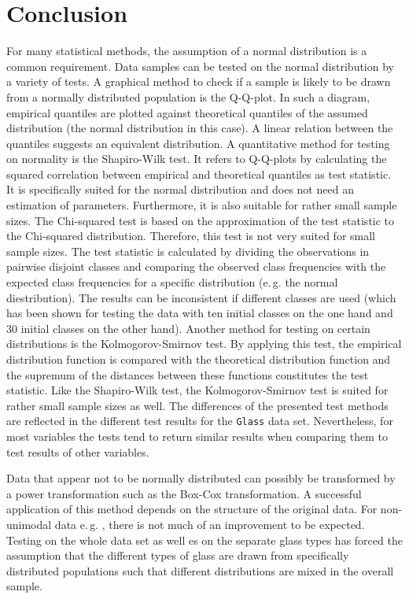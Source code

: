 \documentclass[a4paper, 12pt, titlepage, headsepline, listof = totoc, bibliography = totoc, numbers = noenddot]{scrartcl}
\newcommand{\eg}{e.\,g. }
\begin{document}
\newpage
\section{Conclusion}\label{sec:conclusion}
For many statistical methods, the assumption of a normal distribution is a common requirement. Data samples can be tested on the normal distribution by a variety of tests. A graphical method to check if a sample is likely to be drawn from a normally distributed population is the Q-Q-plot. In such a diagram, empirical quantiles are plotted against theoretical quantiles of the assumed distribution (the normal distribution in this case). A linear relation between the quantiles suggests an equivalent distribution. A quantitative method for testing on normality is the Shapiro-Wilk test. It refers to Q-Q-plots by calculating the squared correlation between empirical and theoretical quantiles as test statistic. It is specifically suited for the normal distribution and does not need an estimation of parameters. Furthermore, it is also suitable for rather small sample sizes. The Chi-squared test is based on the approximation of the test statistic to the Chi-squared distribution. Therefore, this test is not very suited for small sample sizes. The test statistic is calculated by dividing the observations in pairwise disjoint classes and comparing the observed class frequencies with the expected class frequencies for a specific distribution (\eg the normal diestribution). The results can be inconsistent if different classes are used (which has been shown for testing the data with ten initial classes on the one hand and 30 initial classes on the other hand). Another method for testing on certain distributions is the Kolmogorov-Smirnov test. By applying this test, the empirical distribution function is compared with the theoretical distribution function and the supremum of the distances between these functions constitutes the test statistic. Like the Shapiro-Wilk test, the Kolmogorov-Smirnov test is suited for rather small sample sizes as well. The differences of the presented test methods are reflected in the different test results for the \texttt{Glass} data set. Nevertheless, for most variables the tests tend to return similar results when comparing them to test results of other variables.

Data that appear not to be normally distributed can possibly be transformed by a power transformation such as the Box-Cox transformation. A successful application of this method depends on the structure of the original data. For non-unimodal data \eg, there is not much of an improvement to be expected. Testing on the whole data set as well es on the separate glass types has forced the assumption that the different types of glass are drawn from specifically distributed populations such that different distributions are mixed in the overall sample.
\end{document}
